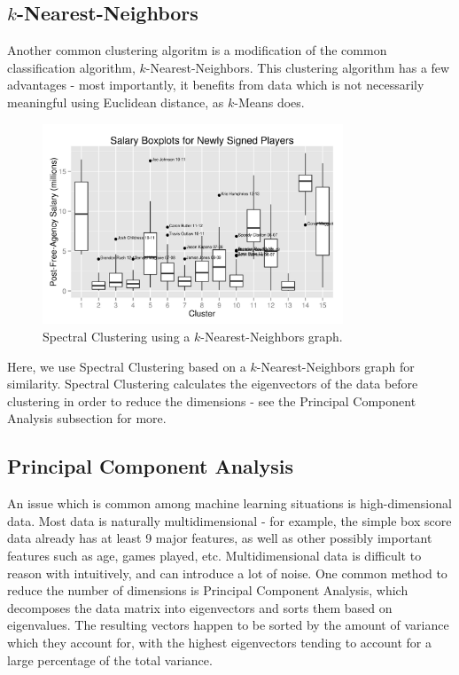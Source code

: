 \documentclass{article}
\begin{document}
\subsection{$k$-Nearest-Neighbors}

Another common clustering algoritm is a modification of the common classification algorithm, $k$-Nearest-Neighbors. This clustering algorithm has a few advantages - most importantly, it benefits from data which is not necessarily meaningful using Euclidean distance, as $k$-Means does.

\begin{figure}[h!]
    \centering
    \includegraphics[width=0.8\textwidth]{sc.jpeg}
    \caption{Spectral Clustering using a $k$-Nearest-Neighbors graph.}
\end{figure}

Here, we use Spectral Clustering based on a $k$-Nearest-Neighbors graph for similarity. Spectral Clustering calculates the eigenvectors of the data before clustering in order to reduce the dimensions - see the Principal Component Analysis subsection for more.

\subsection{Principal Component Analysis}

An issue which is common among machine learning situations is high-dimensional data. Most data is naturally multidimensional - for example, the simple box score data already has at least 9 major features, as well as other possibly important features such as age, games played, etc. Multidimensional data is difficult to reason with intuitively, and can introduce a lot of noise. One common method to reduce the number of dimensions is Principal Component Analysis, which decomposes the data matrix into eigenvectors and sorts them based on eigenvalues. The resulting vectors happen to be sorted by the amount of variance which they account for, with the highest eigenvectors tending to account for a large percentage of the total variance.
\end{document}
